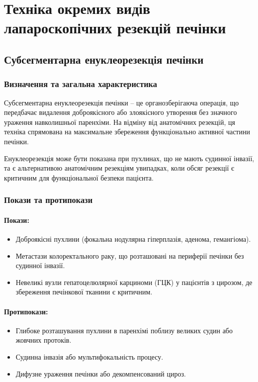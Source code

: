 \chapter{Техніка окремих видів лапароскопічних резекцій печінки} 

\begin{refsection}

\section{Субсегментарна енуклеорезекція печінки}
\subsection{Визначення та загальна характеристика}
Субсегментарна енуклеорезекція печінки – це органозберігаюча операція, що передбачає видалення доброякісного або злоякісного утворення без значного ураження навколишньої паренхіми. На відміну від анатомічних резекцій, ця техніка спрямована на максимальне збереження функціонально активної частини печінки.

Енуклеорезекція може бути показана при пухлинах, що не мають судинної інвазії, та є альтернативою анатомічним резекціям увипадках, коли обсяг резекції є критичним для функціональної безпеки пацієнта.

\subsection{Покази та протипокази}
\subsubsection{Покази:}
\begin{itemize}
    \item Доброякісні пухлини (фокальна нодулярна гіперплазія, аденома, гемангіома).
    \item Метастази колоректального раку, що розташовані на периферії печінки без судинної інвазії.
    \item Невеликі вузли гепатоцелюлярної карциноми (ГЦК) у пацієнтів з цирозом, де збереження печінкової тканини є критичним.
\end{itemize}

\subsubsection{Протипокази:}
\begin{itemize}
    \item Глибоке розташування пухлини в паренхімі поблизу великих судин або жовчних протоків.
    \item Судинна інвазія або мультифокальність процесу.
    \item Дифузне ураження печінки або декомпенсований цироз.
\end{itemize}


\end{refsection}

